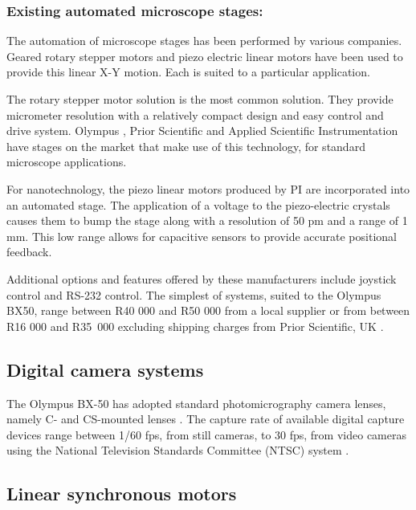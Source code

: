 \documentclass[10pt,twocolumn]{witseiepaper}
\begin{document}
\subsubsection*{Existing automated microscope stages:}

The automation of microscope stages has been performed by various companies.
Geared rotary stepper motors and piezo electric linear motors have been used
to provide this linear X-Y motion.  Each is suited to a particular
application.

The rotary stepper motor solution is the most common solution.  They provide
micrometer resolution with a relatively compact design and easy control and
drive system.  Olympus \cite{Olympus}, Prior Scientific \cite{Prior} and Applied
Scientific Instrumentation \cite{Ms4} have stages on the market that make use
of this technology, for standard microscope applications.

For nanotechnology, the piezo linear motors produced by PI \cite{PI} are
incorporated into an automated stage.  The application of a voltage to the
piezo-electric crystals causes them to bump the stage along with a resolution
of 50 pm and a range of 1 mm.  This low range allows for capacitive sensors to
provide accurate positional feedback.

Additional options and features offered by these manufacturers include
joystick control and RS-232 control.  The simplest of systems, suited to the
Olympus BX50, range between R40 000 and R50 000 from a local
supplier \cite{Elmulab} or from between R16 000 and \mbox{R35 000} excluding
shipping charges from Prior Scientific, UK \cite{Prior}. 

\subsection{Digital camera systems}

The Olympus BX-50 has adopted standard photomicrography camera lenses, namely
C- and CS-mounted lenses \cite{Olympus}.  The capture rate of available
digital capture devices range between 1/60 fps, from still cameras, to 30 fps,
from video cameras using the National Television Standards Committee (NTSC)
system \cite{Olympus}.

\subsection{Linear synchronous motors}
\end{document}
